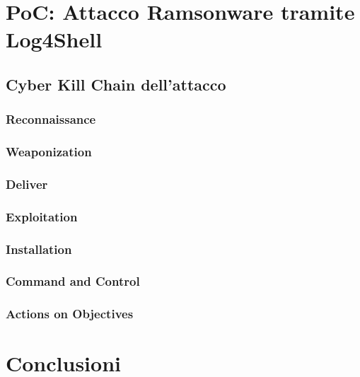 \documentclass[a4paper, 12pt]{article}
\begin{document}
\section{PoC: Attacco Ramsonware tramite Log4Shell}

\subsection{Cyber Kill Chain dell'attacco}
\subsubsection{Reconnaissance}

\subsubsection{Weaponization}

\subsubsection{Deliver}

\subsubsection{Exploitation}

\subsubsection{Installation}

\subsubsection{Command and Control}

\subsubsection{Actions on Objectives}

\section{Conclusioni}


\nocite{*}

\end{document}
